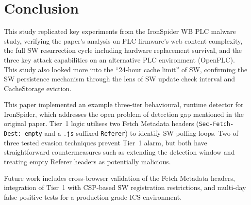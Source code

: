 \documentclass[conference]{IEEEtran}
\begin{document}
\section{Conclusion}
\label{sec:conclusion}

This study replicated key experiments from the IronSpider WB PLC malware study, verifying the paper's analysis on PLC firmware's web content complexity, the full SW resurrection cycle including hardware replacement survival, and the three key attack capabilities on an alternative PLC environment (OpenPLC). This study also looked more into the ``24-hour cache limit'' of SW, confirming the SW persistence mechanism through the lens of SW update check interval and CacheStorage eviction.

This paper implemented an example three-tier behavioural, runtime detector for IronSpider, which addresses the open problem of detection gap mentioned in the original paper. Tier~1 logic utilises two Fetch Metadata headers (\texttt{Sec-Fetch-Dest: empty} and a \texttt{.js}-suffixed \texttt{Referer}) to identify SW polling loops. Two of three tested evasion techniques prevent Tier~1 alarm, but both have straightforward countermeasures such as extending the detection window and treating empty Referer headers as potentially malicious.

Future work includes cross-browser validation of the Fetch Metadata headers, integration of Tier~1 with CSP-based SW registration restrictions, and multi-day false positive tests for a production-grade ICS environment.
\end{document}
